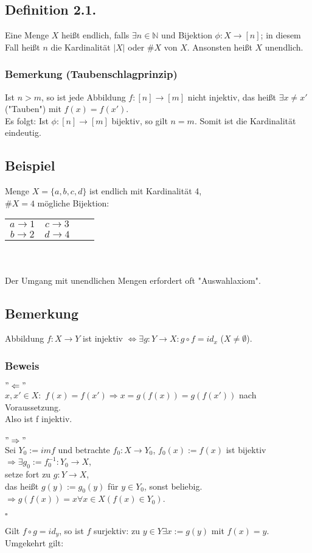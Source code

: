 \documentclass[a4paper, 12pt]{extarticle}
\begin{document}
\subsection*{Definition 2.1.}
Eine Menge $X$ heißt endlich, falls $\exists n \in \mathbb{N}$ und Bijektion $\phi: X \rightarrow [n]$; in diesem Fall heißt $n$ die Kardinalität $|X|$ oder $\#X$ von $X$.
Ansonsten heißt $X$ unendlich. 
\subsubsection*{Bemerkung (Taubenschlagprinzip)}
Ist $n>m$, so ist jede Abbildung $f: [n] \rightarrow [m]$ nicht injektiv, das heißt $\exists x\neq x'$ ("Tauben") mit $f(x) = f(x')$. \\
Es folgt: Ist $\phi : [n] \rightarrow [m]$ bijektiv, so gilt $n=m$. Somit ist die Kardinalität eindeutig.

\subsection*{Beispiel}
Menge $X = \{a,b,c,d\}$ ist endlich mit Kardinalität 4, \\
$\#X =  4$ mögliche Bijektion: 
\begin{tabular}{cccc}
$a \rightarrow 1$ & $c \rightarrow 3$ \\
$b \rightarrow 2$ & $d \rightarrow 4$ \\
\end{tabular}
\\
\\
Der Umgang mit unendlichen Mengen erfordert oft "Auswahlaxiom".

\subsection*{Bemerkung}
Abbildung $f: X \rightarrow Y$ ist injektiv $\Leftrightarrow \exists g: Y \rightarrow X : g \circ f = id_x$ ($X \neq \emptyset $).
\subsubsection*{Beweis}
$"\Leftarrow"$ \\
$x,x' \in X :$
$f(x) = f(x') \Rightarrow  x = g(f(x)) = g(f(x'))$ nach Voraussetzung.\\
Also ist f injektiv. \\ 
\\
$"\Rightarrow"$\\
Sei $Y_0 := im f$ und betrachte $f_0 : X \rightarrow Y_0$, $f_0(x) := f(x)$ ist bijektiv \\
 $\Rightarrow \exists g_0 := f_0^{-1}: Y_0 \rightarrow X$,\\
setze fort zu $g: Y \rightarrow X$,\\
das heißt $g(y) := g_0(y)$ für $y\in Y_0$, sonst beliebig.\\
$\Rightarrow g(f(x)) = x \forall  x \in X (f(x) \in Y_0)$.\\
\begin{flushright}
$\square$\\
\end{flushright}
Gilt $f \circ g = id_y$, so ist $f$ surjektiv: zu $y\in Y \exists x:= g(y)$ mit $f(x) = y$.\\
Umgekehrt gilt:
\end{document}
